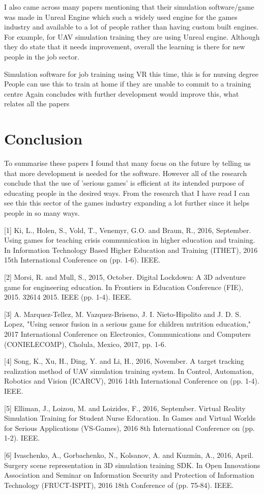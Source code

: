 \documentclass{scrartcl}
\begin{document}
I also came across many papers mentioning that their simulation software/game was made in Unreal Engine which such a widely used engine for the games industry and available to a lot of people rather than having custom built engines. For example, for UAV simulation training they are using Unreal engine. Although they do state that it needs improvement, overall the learning is there for new people in the job sector. 


Simulation software for job training using VR this time, this is for nursing degree 
People can use this to train at home if they are unable to commit to a training centre 
Again concludes with further development would improve this, what relates all the papers 



\section*{Conclusion}
To summarise these papers I found that many focus on the future by telling us that more development is needed for the software. However all of the research conclude that the use of 'serious games' is efficient at its intended purpose of educating people in the desired ways. From the research that I have read I can see this this sector of the games industry expanding a lot further since it helps people in so many ways. 




[1] Ki, L., Holen, S., Vold, T., Venemyr, G.O. and Braun, R., 2016, September. Using games for teaching crisis communication in higher education and training. In Information Technology Based Higher Education and Training (ITHET), 2016 15th International Conference on (pp. 1-6). IEEE.

[2] Morsi, R. and Mull, S., 2015, October. Digital Lockdown: A 3D adventure game for engineering education. In Frontiers in Education Conference (FIE), 2015. 32614 2015. IEEE (pp. 1-4). IEEE.

[3] A. Marquez-Tellez, M. Vazquez-Briseno, J. I. Nieto-Hipolito and J. D. S. Lopez, "Using sensor fusion in a serious game for children nutrition education," 2017 International Conference on Electronics, Communications and Computers (CONIELECOMP), Cholula, Mexico, 2017, pp. 1-6.


[4] Song, K., Xu, H., Ding, Y. and Li, H., 2016, November. A target tracking realization method of UAV simulation training system. In Control, Automation, Robotics and Vision (ICARCV), 2016 14th International Conference on (pp. 1-4). IEEE.

[5] Elliman, J., Loizou, M. and Loizides, F., 2016, September. Virtual Reality Simulation Training for Student Nurse Education. In Games and Virtual Worlds for Serious Applications (VS-Games), 2016 8th International Conference on (pp. 1-2). IEEE.

[6] Ivaschenko, A., Gorbachenko, N., Kolsanov, A. and Kuzmin, A., 2016, April. Surgery scene representation in 3D simulation training SDK. In Open Innovations Association and Seminar on Information Security and Protection of Information Technology (FRUCT-ISPIT), 2016 18th Conference of (pp. 75-84). IEEE.
\end{document}
